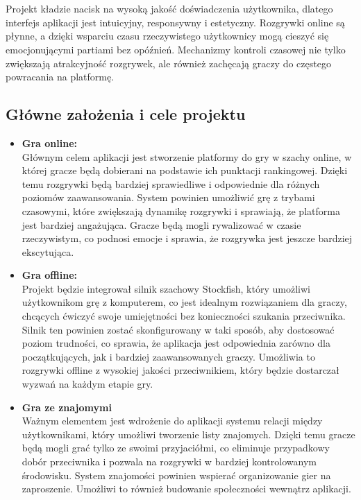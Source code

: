 \documentclass[12pt,a4paper]{article}
\begin{document}
\\\\
Projekt kładzie nacisk na wysoką jakość doświadczenia użytkownika, dlatego interfejs aplikacji jest intuicyjny, responsywny i estetyczny. Rozgrywki online są płynne, a dzięki wsparciu czasu rzeczywistego użytkownicy mogą cieszyć się emocjonującymi partiami bez opóźnień. Mechanizmy kontroli czasowej nie tylko zwiększają atrakcyjność rozgrywek, ale również zachęcają graczy do częstego powracania na platformę.


\newpage

\subsection{Główne założenia i cele projektu}

\begin{itemize}
    \item \textbf{Gra online:}\\
    Głównym celem aplikacji jest stworzenie platformy do gry w szachy online, w której gracze będą dobierani na podstawie ich punktacji rankingowej. Dzięki temu rozgrywki będą bardziej sprawiedliwe i odpowiednie dla różnych poziomów zaawansowania. System powinien umożliwić grę z trybami czasowymi, które zwiększają dynamikę rozgrywki i sprawiają, że platforma jest bardziej angażująca. Gracze będą mogli rywalizować w czasie rzeczywistym, co podnosi emocje i sprawia, że rozgrywka jest jeszcze bardziej ekscytująca.
    \item \textbf{Gra offline:}\\
    Projekt będzie integrował silnik szachowy Stockfish, który umożliwi użytkownikom grę z komputerem, co jest idealnym rozwiązaniem dla graczy, chcących ćwiczyć swoje umiejętności bez konieczności szukania przeciwnika. Silnik ten powinien zostać skonfigurowany w taki sposób, aby dostosować poziom trudności, co sprawia, że aplikacja jest odpowiednia zarówno dla początkujących, jak i bardziej zaawansowanych graczy. Umożliwia to rozgrywki offline z wysokiej jakości przeciwnikiem, który będzie dostarczał wyzwań na każdym etapie gry.
    \item \textbf{Gra ze znajomymi}\\
    Ważnym elementem jest wdrożenie do aplikacji systemu relacji między użytkownikami, który umożliwi tworzenie listy znajomych. Dzięki temu gracze będą mogli grać tylko ze swoimi przyjaciółmi, co eliminuje przypadkowy dobór przeciwnika i pozwala na rozgrywki w bardziej kontrolowanym środowisku. System znajomości powinien wspierać organizowanie gier na zaproszenie. Umożliwi to również budowanie społeczności wewnątrz aplikacji.

\end{itemize}
\end{document}

